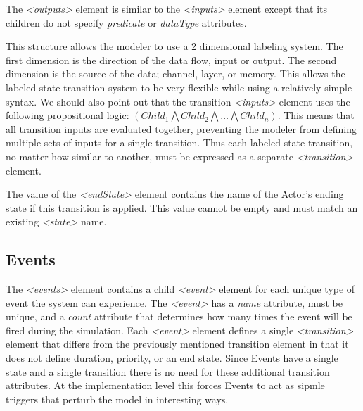 The {\em \textless outputs\textgreater} element is similar to the {\em \textless inputs\textgreater} element except that its children do not specify {\em predicate} or {\em dataType} attributes.  

This structure allows the modeler to use a 2 dimensional labeling system.  The first dimension is the direction of the data flow, input or output.  The second dimension is the source of the data; channel, layer, or memory.  This allows the labeled state transition system to be very flexible while using a relatively simple syntax.  We should also point out that the transition {\em \textless inputs\textgreater} element uses the following propositional logic: $(Child_{1} \bigwedge Child_{2} \bigwedge \ldots \bigwedge Child_{n})$.  This means that all transition inputs are evaluated together, preventing the modeler from defining multiple sets of inputs for a single transition.  Thus each labeled state transition, no matter how similar to another, must be expressed as a separate {\em \textless transition\textgreater} element.

The value of the {\em \textless endState\textgreater} element contains the name of the Actor's ending state if this transition is applied.  This value cannot be empty and must match an existing {\em \textless state\textgreater} name.

\begin{spacing}{.5}

\end{spacing}


\subsection{Events}

The {\em \textless events\textgreater} element contains a child {\em \textless event\textgreater} element for each unique type of event the system can experience.  The {\em \textless event\textgreater} has a {\em name} attribute, must be unique, and a {\em count} attribute that determines how many times the event will be fired during the simulation.  Each {\em \textless event\textgreater} element defines a single {\em \textless transition\textgreater} element that differs from the previously mentioned transition element in that it does not define duration, priority, or an end state.  Since Events have a single state and a single transition there is no need for these additional transition attributes.  At the implementation level this forces Events to act as sipmle triggers that perturb the model in interesting ways.

